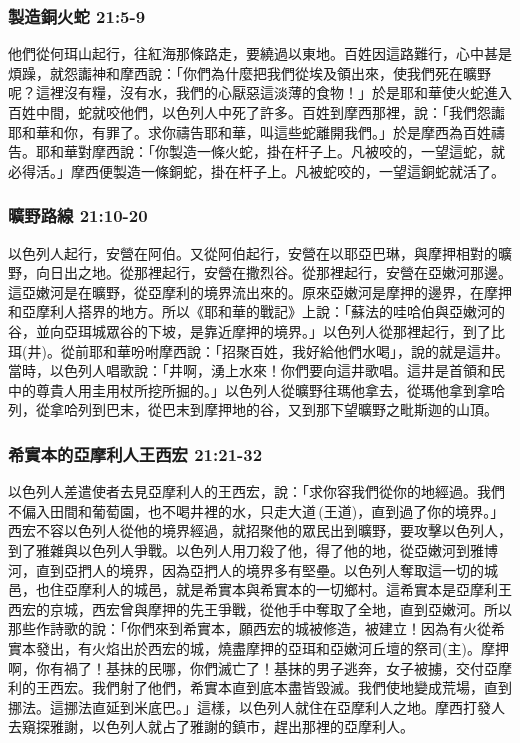 \subsubsection{製造銅火蛇  21:5-9 }
他們從何珥山起行，往紅海那條路走，要繞過以東地。百姓因這路難行，心中甚是煩躁，就怨讟神和摩西說：「你們為什麼把我們從埃及領出來，使我們死在曠野呢？這裡沒有糧，沒有水，我們的心厭惡這淡薄的食物！」於是耶和華使火蛇進入百姓中間，蛇就咬他們，以色列人中死了許多。百姓到摩西那裡，說：「我們怨讟耶和華和你，有罪了。求你禱告耶和華，叫這些蛇離開我們。」於是摩西為百姓禱告。耶和華對摩西說：「你製造一條火蛇，掛在杆子上。凡被咬的，一望這蛇，就必得活。」摩西便製造一條銅蛇，掛在杆子上。凡被蛇咬的，一望這銅蛇就活了。

\subsubsection{曠野路線 21:10-20 }
以色列人起行，安營在阿伯。又從阿伯起行，安營在以耶亞巴琳，與摩押相對的曠野，向日出之地。從那裡起行，安營在撒烈谷。從那裡起行，安營在亞嫩河那邊。這亞嫩河是在曠野，從亞摩利的境界流出來的。原來亞嫩河是摩押的邊界，在摩押和亞摩利人搭界的地方。所以《耶和華的戰記》上說：「蘇法的哇哈伯與亞嫩河的谷，並向亞珥城眾谷的下坡，是靠近摩押的境界。」以色列人從那裡起行，到了比珥(井)。從前耶和華吩咐摩西說：「招聚百姓，我好給他們水喝」，說的就是這井。當時，以色列人唱歌說：「井啊，湧上水來！你們要向這井歌唱。這井是首領和民中的尊貴人用圭用杖所挖所掘的。」以色列人從曠野往瑪他拿去，從瑪他拿到拿哈列，從拿哈列到巴末，從巴末到摩押地的谷，又到那下望曠野之毗斯迦的山頂。

\subsubsection{希實本的亞摩利人王西宏 21:21-32}
以色列人差遣使者去見亞摩利人的王西宏，說：「求你容我們從你的地經過。我們不偏入田間和葡萄園，也不喝井裡的水，只走大道 (王道)，直到過了你的境界。」西宏不容以色列人從他的境界經過，就招聚他的眾民出到曠野，要攻擊以色列人，到了雅雜與以色列人爭戰。以色列人用刀殺了他，得了他的地，從亞嫩河到雅博河，直到亞捫人的境界，因為亞捫人的境界多有堅壘。以色列人奪取這一切的城邑，也住亞摩利人的城邑，就是希實本與希實本的一切鄉村。這希實本是亞摩利王西宏的京城，西宏曾與摩押的先王爭戰，從他手中奪取了全地，直到亞嫩河。所以那些作詩歌的說：「你們來到希實本，願西宏的城被修造，被建立！因為有火從希實本發出，有火焰出於西宏的城，燒盡摩押的亞珥和亞嫩河丘壇的祭司(主)。摩押啊，你有禍了！基抹的民哪，你們滅亡了！基抹的男子逃奔，女子被擄，交付亞摩利的王西宏。我們射了他們，希實本直到底本盡皆毀滅。我們使地變成荒場，直到挪法。這挪法直延到米底巴。」這樣，以色列人就住在亞摩利人之地。摩西打發人去窺探雅謝，以色列人就占了雅謝的鎮市，趕出那裡的亞摩利人。

